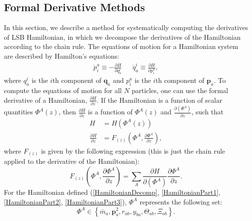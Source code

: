 \documentclass[aps,onecolumn,notitlepage,eqsecnum,nofootinbib,floatfix,superscriptaddress]{revtex4-1}
\begin{document}
%
%
\subsection{Formal Derivative Methods}
In this section, we describe a method for systematically computing the derivatives of LSB Hamiltonian, in which we decompose the derivatives of the Hamiltonian according to the chain rule. The equations of motion for a Hamiltonian system are described by
Hamilton's equations:
\begin{equation}
\begin{aligned} \label{HamiltonEquations}
  \dot{p}_{i}^a\equiv -\frac{\partial H}{\partial q^{i}_a} && \dot{q}^{i}_a\equiv \frac{\partial H}{\partial p_{i}^a},
\end{aligned}
\end{equation}
where $q^{i}_a$ is the $i\mathrm{th}$ component of $\mathbf{q}_{a}$ and $p_{i}^a$ is the $i\mathrm{th}$ component of $\mathbf{p}_{a}$. To compute the equations of motion for all $N$ particles, one can use the formal derivative of a Hamiltonian, $\frac{\partial H}{\partial z}$. If the Hamiltonian is a function of scalar quantities $\Phi^{A}(z)$, then $\frac{\partial H}{\partial z}$ is a function of $\Phi^{A}(z)$ and $\frac{\partial(\Phi^{A})}{\partial z}$, such that
\begin{equation}
\begin{aligned}
  H&= H\left(\Phi^{A}(z)\right) \\
  \frac{\partial H}{\partial z}&= F_{(z)}\left(\Phi^{A},\frac{\partial \Phi^{A}}{\partial z}\right),
\end{aligned}
\end{equation}
where $F_{(z)}$ is given by the following expression (this is just the chain rule applied to the derivative of the Hamiltonian):
\begin{equation} \label{eqn:10}
  F_{(z)}\left(\Phi^{A},\frac{\partial \Phi^{A}}{\partial z}\right) = \sum_{A}\frac{\partial H}{\partial(\Phi^{A})}\frac{\partial \Phi^{A}}{\partial z}.
\end{equation}
For the Hamiltonian defined (\ref{HamiltonianDecomp}, \ref{HamiltonianPart1}, \ref{HamiltonianPart2}, \ref{HamiltonianPart3}), $\Phi^A$ represents the following set:
\begin{equation} \label{PhiSet}
\Phi^{A}\in \left\{\bar{m}_{a},\mathbf{p}^{2}_{a},r_{ab},y_{ba},\Theta_{ab},\Xi_{ab}\right\}.
\end{equation}
\end{document}
